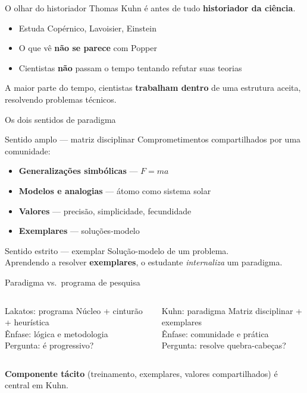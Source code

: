 \documentclass[aspectratio=169]{beamer}
\newcommand{\impt}[1]{\textcolor{maccent}{\textbf{#1}}}
\newcommand{\ntc}[1]{\textcolor{mprimary}{#1}}
\begin{document}
\begin{frame}{O olhar do historiador}
Thomas Kuhn é antes de tudo \impt{historiador da ciência}.
\vspace{0.3cm}
\pause
\begin{itemize}
  \item Estuda Copérnico, Lavoisier, Einstein
  \pause
  \item O que vê \impt{não se parece} com Popper
  \pause
  \item Cientistas \impt{não} passam o tempo tentando refutar suas teorias
\end{itemize}
\vspace{0.4cm}
\pause
\begin{block}{}
A maior parte do tempo, cientistas \impt{trabalham dentro} de uma estrutura aceita, resolvendo problemas técnicos.
\end{block}
\end{frame}

\begin{frame}{Os dois sentidos de paradigma}
\begin{block}{Sentido amplo --- matriz disciplinar}
Comprometimentos compartilhados por uma comunidade:
\begin{itemize}
  \item \impt{Generalizações simbólicas} --- $F = ma$
  \item \impt{Modelos e analogias} --- átomo como sistema solar
  \item \impt{Valores} --- precisão, simplicidade, fecundidade
  \item \impt{Exemplares} --- soluções-modelo
\end{itemize}
\end{block}
\pause
\begin{block}{Sentido estrito --- exemplar}
Solução-modelo de um problema. \\
Aprendendo a resolver \impt{exemplares}, o estudante \emph{internaliza} um paradigma.
\end{block}
\end{frame}

\begin{frame}{Paradigma vs.\ programa de pesquisa}
\begin{columns}[t]
\begin{block}{Lakatos: programa}
Núcleo + cinturão + heurística \\[0.2cm]
\ntc{Ênfase:} lógica e metodologia \\
\ntc{Pergunta:} é progressivo?
\end{block}

\pause
\begin{block}{Kuhn: paradigma}
Matriz disciplinar + exemplares \\[0.2cm]
\ntc{Ênfase:} comunidade e prática \\
\ntc{Pergunta:} resolve quebra-cabeças?
\end{block}
\end{columns}
\vspace{0.5cm}
\pause
\impt{Componente tácito} (treinamento, exemplares, valores compartilhados) é central em Kuhn.
\end{frame}
\end{document}
